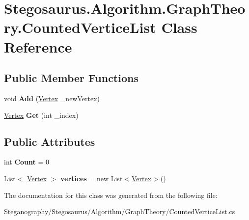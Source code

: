 \hypertarget{class_stegosaurus_1_1_algorithm_1_1_graph_theory_1_1_counted_vertice_list}{}\section{Stegosaurus.\+Algorithm.\+Graph\+Theory.\+Counted\+Vertice\+List Class Reference}
\label{class_stegosaurus_1_1_algorithm_1_1_graph_theory_1_1_counted_vertice_list}
\subsection*{Public Member Functions}
\begin{DoxyCompactItemize}
\item 
void {\bfseries Add} (\hyperlink{class_stegosaurus_1_1_algorithm_1_1_graph_theory_1_1_vertex}{Vertex} \+\_\+new\+Vertex)\hypertarget{class_stegosaurus_1_1_algorithm_1_1_graph_theory_1_1_counted_vertice_list_a1f643243c256fb7c317954ec4bd0d29a}{}\label{class_stegosaurus_1_1_algorithm_1_1_graph_theory_1_1_counted_vertice_list_a1f643243c256fb7c317954ec4bd0d29a}

\item 
\hyperlink{class_stegosaurus_1_1_algorithm_1_1_graph_theory_1_1_vertex}{Vertex} {\bfseries Get} (int \+\_\+index)\hypertarget{class_stegosaurus_1_1_algorithm_1_1_graph_theory_1_1_counted_vertice_list_a67d04680ba06801c47bc45fc6456ea49}{}\label{class_stegosaurus_1_1_algorithm_1_1_graph_theory_1_1_counted_vertice_list_a67d04680ba06801c47bc45fc6456ea49}

\end{DoxyCompactItemize}
\subsection*{Public Attributes}
\begin{DoxyCompactItemize}
\item 
int {\bfseries Count} = 0\hypertarget{class_stegosaurus_1_1_algorithm_1_1_graph_theory_1_1_counted_vertice_list_a209a4a0877da2d127a2dbb769a22d929}{}\label{class_stegosaurus_1_1_algorithm_1_1_graph_theory_1_1_counted_vertice_list_a209a4a0877da2d127a2dbb769a22d929}

\item 
List$<$ \hyperlink{class_stegosaurus_1_1_algorithm_1_1_graph_theory_1_1_vertex}{Vertex} $>$ {\bfseries vertices} = new List$<$\hyperlink{class_stegosaurus_1_1_algorithm_1_1_graph_theory_1_1_vertex}{Vertex}$>$()\hypertarget{class_stegosaurus_1_1_algorithm_1_1_graph_theory_1_1_counted_vertice_list_a951306fa54af75dd02c6aad68601ddc2}{}\label{class_stegosaurus_1_1_algorithm_1_1_graph_theory_1_1_counted_vertice_list_a951306fa54af75dd02c6aad68601ddc2}

\end{DoxyCompactItemize}


The documentation for this class was generated from the following file\+:\begin{DoxyCompactItemize}
\item 
Steganography/\+Stegosaurus/\+Algorithm/\+Graph\+Theory/Counted\+Vertice\+List.\+cs\end{DoxyCompactItemize}
